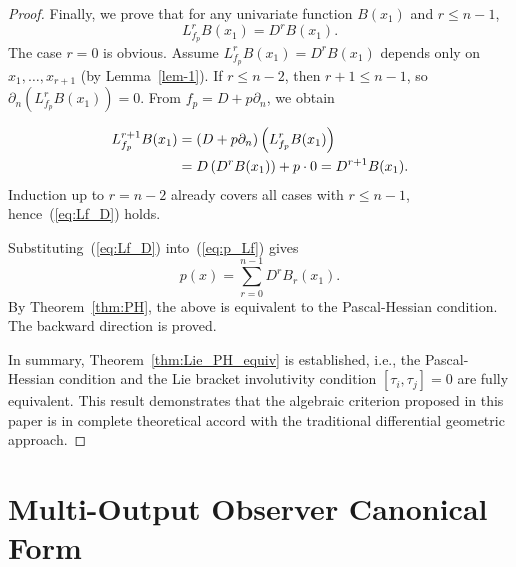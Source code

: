 \documentclass[11pt]{article}
\begin{document}
\begin{proof}
	Finally, we prove that for any univariate function $B(x_1)$ and $r\leq n-1$,
	\begin{equation}\label{eq:Lf_D}
		L_{f_p}^rB(x_1)=D^rB(x_1).
	\end{equation}
	The case $r=0$ is obvious. Assume $L_{f_p}^rB(x_1)=D^rB(x_1)$ depends only on $x_1,\ldots,x_{r+1}$ (by Lemma~\ref{lem-1}). If $r\leq n-2$, then $r+1\leq n-1$, so $\partial_n\left(L_{f_p}^rB(x_1)\right)=0$. From $f_p=D+p\partial_n$, we obtain
	
	\begin{align}
		L_{f_p}^{r+1}B(x_1)&=(D+p\partial_n)\left(L_{f_p}^rB(x_1)\right)\notag\\
		&=D\left(D^rB(x_1)\right)+p\cdot0=D^{r+1}B(x_1).
	\end{align}
	Induction up to $r=n-2$ already covers all cases with $r\leq n-1$, hence~(\ref{eq:Lf_D}) holds.

	Substituting~(\ref{eq:Lf_D}) into~(\ref{eq:p_Lf}) gives
	\[
	p(x)=\sum_{r=0}^{n-1}D^rB_r(x_1).
	\]
	By Theorem~\ref{thm:PH}, the above is equivalent to the Pascal-Hessian condition. The backward direction is proved.

	In summary, Theorem~\ref{thm:Lie_PH_equiv} is established, i.e., the Pascal-Hessian condition and the Lie bracket involutivity condition $[\tau_i,\tau_j]=0$ are fully equivalent. This result demonstrates that the algebraic criterion proposed in this paper is in complete theoretical accord with the traditional differential geometric approach.
\end{proof}

\section{Multi-Output Observer Canonical Form}\label{app3}
\end{document}
